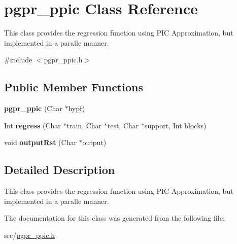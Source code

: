 \hypertarget{classpgpr__ppic}{\section{pgpr\-\_\-ppic Class Reference}
\label{classpgpr__ppic}
}


This class provides the regression function using P\-I\-C Approximation, but implemented in a paralle manner.  




{\ttfamily \#include $<$pgpr\-\_\-ppic.\-h$>$}

\subsection*{Public Member Functions}
\begin{DoxyCompactItemize}
\item 
\hypertarget{classpgpr__ppic_a265983e631160128b356f3a04532622d}{{\bfseries pgpr\-\_\-ppic} (Char $\ast$hypf)}\label{classpgpr__ppic_a265983e631160128b356f3a04532622d}

\item 
\hypertarget{classpgpr__ppic_adbb199505cefb82f2765e259100f52e1}{Int {\bfseries regress} (Char $\ast$train, Char $\ast$test, Char $\ast$support, Int blocks)}\label{classpgpr__ppic_adbb199505cefb82f2765e259100f52e1}

\item 
\hypertarget{classpgpr__ppic_a765337e712a4eeb5c2de3e9c0ea7241b}{void {\bfseries output\-Rst} (Char $\ast$output)}\label{classpgpr__ppic_a765337e712a4eeb5c2de3e9c0ea7241b}

\end{DoxyCompactItemize}


\subsection{Detailed Description}
This class provides the regression function using P\-I\-C Approximation, but implemented in a paralle manner. 

The documentation for this class was generated from the following file\-:\begin{DoxyCompactItemize}
\item 
src/\hyperlink{pgpr__ppic_8h}{pgpr\-\_\-ppic.\-h}\end{DoxyCompactItemize}
